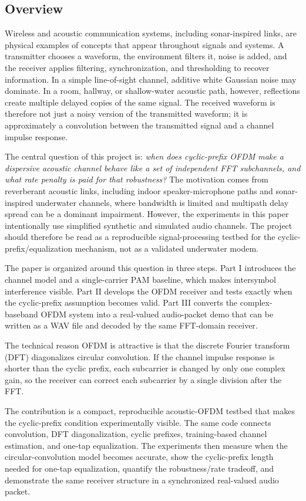 \documentclass[conference]{IEEEtran}
\begin{document}
\subsection{Overview}
Wireless and acoustic communication systems, including sonar-inspired links, are physical examples of concepts that appear throughout signals and systems. A transmitter chooses a waveform, the environment filters it, noise is added, and the receiver applies filtering, synchronization, and thresholding to recover information. In a simple line-of-sight channel, additive white Gaussian noise may dominate. In a room, hallway, or shallow-water acoustic path, however, reflections create multiple delayed copies of the same signal. The received waveform is therefore not just a noisy version of the transmitted waveform; it is approximately a convolution between the transmitted signal and a channel impulse response.

The central question of this project is: \emph{when does cyclic-prefix OFDM make a dispersive acoustic channel behave like a set of independent FFT subchannels, and what rate penalty is paid for that robustness?} The motivation comes from reverberant acoustic links, including indoor speaker-microphone paths and sonar-inspired underwater channels, where bandwidth is limited and multipath delay spread can be a dominant impairment. However, the experiments in this paper intentionally use simplified synthetic and simulated audio channels. The project should therefore be read as a reproducible signal-processing testbed for the cyclic-prefix/equalization mechanism, not as a validated underwater modem.

The paper is organized around this question in three steps. Part I introduces the channel model and a single-carrier PAM baseline, which makes intersymbol interference visible. Part II develops the OFDM receiver and tests exactly when the cyclic-prefix assumption becomes valid. Part III converts the complex-baseband OFDM system into a real-valued audio-packet demo that can be written as a WAV file and decoded by the same FFT-domain receiver.

The technical reason OFDM is attractive is that the discrete Fourier transform (DFT) diagonalizes circular convolution. If the channel impulse response is shorter than the cyclic prefix, each subcarrier is changed by only one complex gain, so the receiver can correct each subcarrier by a single division after the FFT.

The contribution is a compact, reproducible acoustic-OFDM testbed that makes the cyclic-prefix condition experimentally visible. The same code connects convolution, DFT diagonalization, cyclic prefixes, training-based channel estimation, and one-tap equalization. The experiments then measure when the circular-convolution model becomes accurate, show the cyclic-prefix length needed for one-tap equalization, quantify the robustness/rate tradeoff, and demonstrate the same receiver structure in a synchronized real-valued audio packet.
\end{document}

